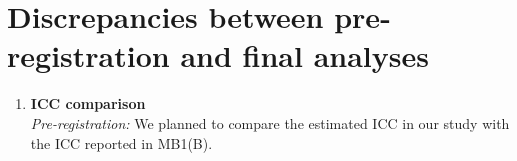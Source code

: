 \documentclass[
  english,
  ,man,floatsintext]{apa6}
\begin{document}
\endgroup

\newpage

\newpage

\appendix


\section{Discrepancies between pre-registration and final analyses}\label{discrepancies-between-pre-registration-and-final-analyses}

\begin{enumerate}
\def\labelenumi{\arabic{enumi}.}
\item
  \textbf{ICC comparison}\\
  \emph{Pre-registration:} We planned to compare the estimated ICC in our study with the ICC reported in MB1(B).


\end{enumerate}
\end{document}
